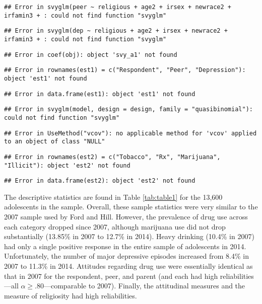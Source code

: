 \documentclass[]{DissertateUSU}
\begin{document}
\begin{verbatim}
## Error in svyglm(peer ~ religious + age2 + irsex + newrace2 + irfamin3 + : could not find function "svyglm"
\end{verbatim}

\begin{verbatim}
## Error in svyglm(dep ~ religious + age2 + irsex + newrace2 + irfamin3 + : could not find function "svyglm"
\end{verbatim}

\begin{verbatim}
## Error in coef(obj): object 'svy_a1' not found
\end{verbatim}

\begin{verbatim}
## Error in rownames(est1) = c("Respondent", "Peer", "Depression"): object 'est1' not found
\end{verbatim}

\begin{verbatim}
## Error in data.frame(est1): object 'est1' not found
\end{verbatim}

\begin{verbatim}
## Error in svyglm(model, design = design, family = "quasibinomial"): could not find function "svyglm"
\end{verbatim}

\begin{verbatim}
## Error in UseMethod("vcov"): no applicable method for 'vcov' applied to an object of class "NULL"
\end{verbatim}

\begin{verbatim}
## Error in rownames(est2) = c("Tobacco", "Rx", "Marijuana", "Illicit"): object 'est2' not found
\end{verbatim}

\begin{verbatim}
## Error in data.frame(est2): object 'est2' not found
\end{verbatim}

The descriptive statistics are found in Table \ref{tab:table1} for the
13,600 adolescents in the sample. Overall, these sample statistics were
very similar to the 2007 sample used by Ford and Hill. However, the
prevalence of drug use across each category dropped since 2007, although
marijuana use did not drop substantially (13.85\% in 2007 to 12.7\% in
2014). Heavy drinking (10.4\% in 2007) had only a single positive
response in the entire sample of adolescents in 2014. Unfortunately, the
number of major depressive episodes increased from 8.4\% in 2007 to
11.3\% in 2014. Attitudes regarding drug use were essentially identical
as that in 2007 for the respondent, peer, and parent (and each had high
reliabilities---all \(\alpha \geq .80\)---comparable to 2007). Finally,
the attitudinal measures and the measure of religiosity had high
reliabilities.
\end{document}
